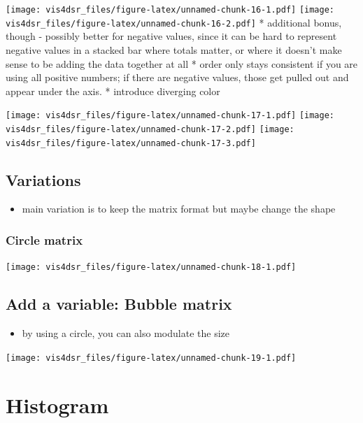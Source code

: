\documentclass[
]{krantz}
\providecommand{\tightlist}{%
  \setlength{\itemsep}{0pt}\setlength{\parskip}{0pt}}
\begin{document}
\texttt{[image: vis4dsr\_files/figure-latex/unnamed-chunk-16-1.pdf]} \texttt{[image: vis4dsr\_files/figure-latex/unnamed-chunk-16-2.pdf]}
* additional bonus, though - possibly better for negative values, since it can be
hard to represent negative values in a stacked bar where totals matter, or where
it doesn't make sense to be adding the data together at all
* order only stays consistent if you are using all positive numbers; if there are
negative values, those get pulled out and appear under the axis.
* introduce diverging color

\texttt{[image: vis4dsr\_files/figure-latex/unnamed-chunk-17-1.pdf]} \texttt{[image: vis4dsr\_files/figure-latex/unnamed-chunk-17-2.pdf]} \texttt{[image: vis4dsr\_files/figure-latex/unnamed-chunk-17-3.pdf]}

\hypertarget{variations-4}{%
\subsection{Variations}\label{variations-4}}

\begin{itemize}
\tightlist
\item
  main variation is to keep the matrix format but maybe change the shape
\end{itemize}

\hypertarget{circle-matrix}{%
\subsubsection{Circle matrix}\label{circle-matrix}}

\texttt{[image: vis4dsr\_files/figure-latex/unnamed-chunk-18-1.pdf]}

\hypertarget{add-a-variable-bubble-matrix}{%
\subsection{Add a variable: Bubble matrix}\label{add-a-variable-bubble-matrix}}

\begin{itemize}
\tightlist
\item
  by using a circle, you can also modulate the size
\end{itemize}

\texttt{[image: vis4dsr\_files/figure-latex/unnamed-chunk-19-1.pdf]}

\hypertarget{histogram}{%
\section{Histogram}\label{histogram}}
\end{document}
